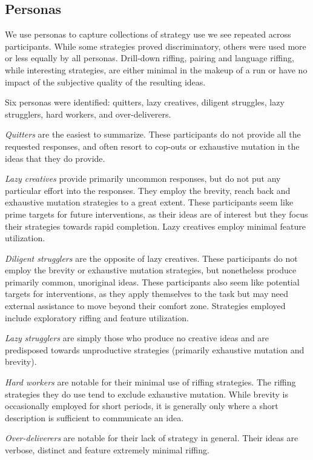 \subsection{Personas}

We use personas to capture collections of strategy use we see repeated across participants. While some strategies proved discriminatory, others were used more or less equally by all personas. Drill-down riffing, pairing and language riffing, while interesting strategies, are either minimal in the makeup of a run or have no impact of the subjective quality of the resulting ideas.

Six personas were identified: quitters, lazy creatives, diligent struggles, lazy strugglers, hard workers, and over-deliverers.

\emph{Quitters} are the easiest to summarize. These participants do not provide all the requested responses, and often resort to cop-outs or exhaustive mutation in the ideas that they do provide.

\emph{Lazy creatives} provide primarily uncommon responses, but do not put any particular effort into the responses. They employ the brevity, reach back and exhaustive mutation strategies to a great extent. These participants seem like prime targets for future interventions, as their ideas are of interest but they focus their strategies towards rapid completion. Lazy creatives employ minimal feature utilization.

\emph{Diligent strugglers} are the opposite of lazy creatives. These participants do not employ the brevity or exhaustive mutation strategies, but nonetheless produce primarily common, unoriginal ideas. These participants also seem like potential targets for interventions, as they apply themselves to the task but may need external assistance to move beyond their comfort zone. Strategies employed include exploratory riffing and feature utilization.

\emph{Lazy strugglers} are simply those who produce no creative ideas and are predisposed towards unproductive strategies (primarily exhaustive mutation and brevity).

\emph{Hard workers} are notable for their minimal use of riffing strategies. The riffing strategies they do use tend to exclude exhaustive mutation. While brevity is occasionally employed for short periods, it is generally only where a short description is sufficient to communicate an idea.

\emph{Over-deliverers} are notable for their lack of strategy in general. Their ideas are verbose, distinct and feature extremely minimal riffing. 
